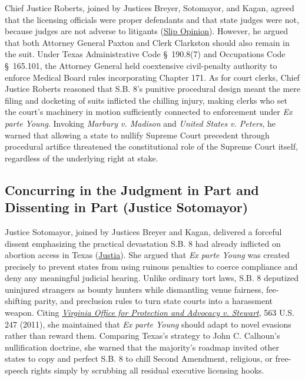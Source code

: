 \documentclass[12pt]{article}
\begin{document}
Chief Justice Roberts, joined by Justices Breyer, Sotomayor, and Kagan, agreed that the licensing officials were proper defendants and that state judges were not, because judges are not adverse to litigants (\href{https://www.supremecourt.gov/opinions/21pdf/21-463_3ebh.pdf}{Slip Opinion}). However, he argued that both Attorney General Paxton and Clerk Clarkston should also remain in the suit. Under Texas Administrative Code \S~190.8(7) and Occupations Code \S~165.101, the Attorney General held coextensive civil-penalty authority to enforce Medical Board rules incorporating Chapter 171. As for court clerks, Chief Justice Roberts reasoned that S.B. 8's punitive procedural design meant the mere filing and docketing of suits inflicted the chilling injury, making clerks who set the court's machinery in motion sufficiently connected to enforcement under \textit{Ex parte Young}. Invoking \textit{Marbury v. Madison} and \textit{United States v. Peters}, he warned that allowing a state to nullify Supreme Court precedent through procedural artifice threatened the constitutional role of the Supreme Court itself, regardless of the underlying right at stake.

\subsection{Concurring in the Judgment in Part and Dissenting in Part (Justice Sotomayor)}

Justice Sotomayor, joined by Justices Breyer and Kagan, delivered a forceful dissent emphasizing the practical devastation S.B. 8 had already inflicted on abortion access in Texas (\href{https://supreme.justia.com/cases/federal/us/595/21-463/}{Justia}). She argued that \textit{Ex parte Young} was created precisely to prevent states from using ruinous penalties to coerce compliance and deny any meaningful judicial hearing. Unlike ordinary tort laws, S.B. 8 deputized uninjured strangers as bounty hunters while dismantling venue fairness, fee-shifting parity, and preclusion rules to turn state courts into a harassment weapon. Citing \href{https://supreme.justia.com/cases/federal/us/563/247/}{\textit{Virginia Office for Protection and Advocacy v. Stewart}}, 563 U.S. 247 (2011), she maintained that \textit{Ex parte Young} should adapt to novel evasions rather than reward them. Comparing Texas's strategy to John C. Calhoun's nullification doctrine, she warned that the majority's roadmap invited other states to copy and perfect S.B. 8 to chill Second Amendment, religious, or free-speech rights simply by scrubbing all residual executive licensing hooks.
\end{document}
